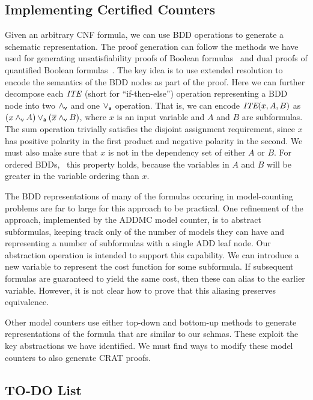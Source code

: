 \documentclass{llncs}
\newcommand{\pand}{\mathbin{\land_{\sf v}}}
\newcommand{\por}{\mathbin{\lor_{\sf a}}}
\newcommand{\obar}[1]{\overline{#1}}
\newcommand{\ite}{\mbox{\it ITE}}
\begin{document}
\subsection{Implementing Certified Counters}

Given an arbitrary CNF formula, we can use BDD operations to generate
a schematic representation.  The proof generation can follow the
methods we have used for generating unsatisfiability proofs of Boolean
formulas~\cite{bryant:tacas:2021} and dual proofs of quantified
Boolean formulas~\cite{bryant:cade:2021}.  The key idea 
is to use extended resolution to encode the semantics of the BDD
nodes as part of the proof.  Here we can further decompose each $\ite$
(short for ``if-then-else'') operation representing a BDD node into
two $\pand$ and one $\por$ operation.  That is, we can encode
$\ite(x,A,B)$ as $(x \pand A) \por (\obar{x} \pand B)$, where $x$ is an
input variable and $A$ and $B$ are subformulas.  The sum operation trivially satisfies the disjoint assignment requirement, since $x$ has positive polarity in the first product and negative polarity in the second.
We must also
make sure that $x$ is not in the dependency set of either $A$ or $B$.
For ordered BDDs,~\cite{Bryant:1986} this property holds, because the
variables in $A$ and $B$ will be greater in the variable ordering than
$x$.

The BDD representations of many of the formulas occuring in
model-counting problems are far to large for this approach to be
practical.  One refinement of the approach, implemented by the ADDMC
model counter, is to abstract subformulas, keeping track only of the
number of models they can have and representing a number of subformulas
with a single ADD leaf node.  Our abstraction operation is intended to
support this capability.  We can
introduce a new variable to represent the cost function for some
subformula.  If subsequent formulas are guaranteed to yield the same
cost, then these can alias to the earlier variable.  However, it is
not clear how to prove that this aliasing preserves equivalence.

Other model counters use either top-down and bottom-up methods to
generate representations of the formula that are similar to our
schmas.  These exploit the key abstractions we have identified.  We
must find ways to modify these model counters to also generate CRAT
proofs.

\subsection{TO-DO List}
\end{document}
